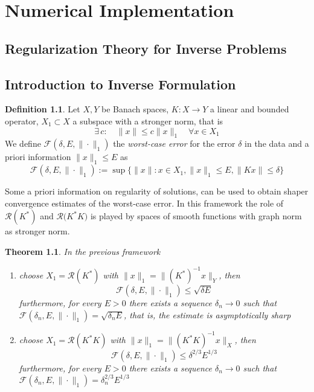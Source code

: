 \documentclass[10pt, a4paper, twoside, openright]{book}
\theoremstyle{definition}
\newtheorem{definition}[subsection]{Definition}
\theoremstyle{plain}
\newtheorem{theorem}[subsection]{Theorem}
\theoremstyle{plain}
\theoremstyle{plain}
\theoremstyle{plain}
\theoremstyle{plain}
\theoremstyle{plain}
\theoremstyle{plain}
\theoremstyle{plain}
\begin{document}
\chapter{Numerical Implementation}
\section{Regularization Theory for Inverse Problems}
\section{Introduction to Inverse Formulation}
\begin{definition}
 Let $X,Y$ be Banach spaces, $K:X\to Y$ a linear and bounded operator, $X_1\subset X$ a subspace with a stronger norm, that is
 \begin{equation}
  \exists \, c:\quad \|x\|\leq c\|x\|_1\quad\forall x\in X_1
 \end{equation}
 We define $\mathcal{F}(\delta, E, \|\cdot\|_1)$ the \emph{worst-case error} for the error $\delta$ in the data and a priori information $\|x\|_1\leq E$ as
 \begin{equation}
  \mathcal{F}(\delta, E, \|\cdot\|_1):= \sup\Big\{\|x\|:x\in X_1, \|x\|_1 \leq E, \|Kx\|\leq\delta\Big\}
 \end{equation}
\end{definition}
Some a priori information on regularity of solutions, can be used to obtain shaper convergence estimates of the worst-case error. In this framework the role of $\mathcal{R}(K^*)$ and $\mathcal{R}({K^*K)}$ is played by spaces of smooth functions with graph norm as stronger norm.
\begin{theorem}
 In the previous framework
 \begin{enumerate}
  \item choose $X_1=\mathcal{R}(K^*)$ with $\|x\|_1=\|(K^*)^{-1}x\|_Y$, then
  \begin{equation}
   \mathcal{F}(\delta, E, \|\cdot\|_1)\leq \sqrt{\delta E}
  \end{equation}
  furthermore, for every $E>0$ there exists a sequence $\delta_n\to 0$ such that $\mathcal{F}(\delta_n, E, \|\cdot\|_1) = \sqrt{\delta_n E}$, that is, the estimate is asymptotically sharp
  \item choose $X_1=\mathcal{R}(K^*K)$ with $\|x\|_1=\|(K^*K)^{-1}x\|_X$, then
  \begin{equation}
   \mathcal{F}(\delta, E, \|\cdot\|_1)\leq \delta^{2/3} E^{1/3}
  \end{equation}
  furthermore, for every $E>0$ there exists a sequence $\delta_n\to 0$ such that $\mathcal{F}(\delta_n, E, \|\cdot\|_1) = \delta_n^{2/3} E^{1/3}$
 \end{enumerate}
\end{theorem}
\end{document}
